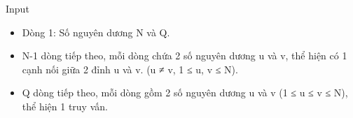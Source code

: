 Input  
\begin{itemize}
	\item      Dòng 1: Số nguyên dương N và Q.    
	\item      N-1 dòng tiếp theo, mỗi dòng chứa 2 số nguyên dương u và v, thể hiện có 1 cạnh nối giữa 2 đỉnh u và v. (u ≠ v, 1 ≤ u, v ≤ N).    
	\item      Q dòng tiếp theo, mỗi dòng gồm 2 số nguyên dương u và v (1 ≤ u ≤ v ≤ N), thể hiện 1 truy vấn.    
\end{itemize}